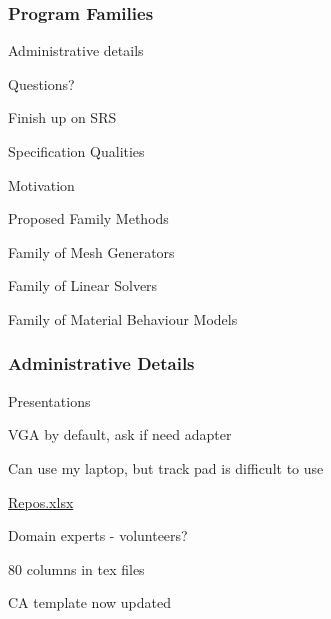 \documentclass[t,12pt,numbers,fleqn]{beamer}
\newcounter{temp}
\begin{document}



\begin{frame}
\frametitle{Program Families}

\bi
\item Administrative details
\item Questions?
\item Finish up on SRS
\item Specification Qualities
\item Motivation
\item Proposed Family Methods
\item Family of Mesh Generators
\item Family of Linear Solvers
\item Family of Material Behaviour Models
\ei
\end{frame}


\begin{frame}
\frametitle{Administrative Details}

\bi
\item Presentations
\bi
\item VGA by default, ask if need adapter
\item Can use my laptop, but track pad is difficult to use
\ei
\item \href{https://gitlab.cas.mcmaster.ca/smiths/cas741/blob/master/Repos.xlsx}{Repos.xlsx}
\item Domain experts - volunteers?
\item 80 columns in tex files
\item CA template now updated
\ei

\end{frame}
\end{document}

